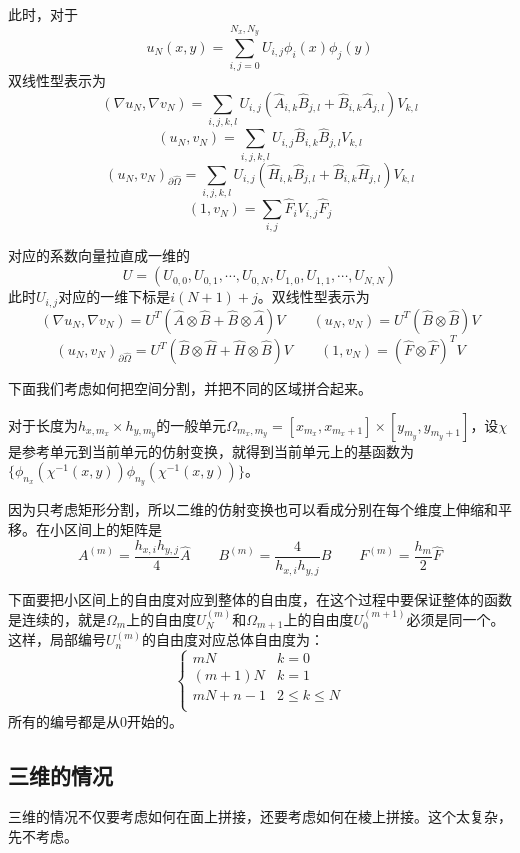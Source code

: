 \documentclass[UTF8,12pt]{article}
\begin{document}
此时，对于
$$ u_N(x,y) = \sum_{i,j = 0}^{N_x, N_y} U_{i,j} \phi_{i}(x) \phi_{j}(y) $$
双线性型表示为
$$ (\nabla u_N, \nabla v_N) = \sum_{i,j,k,l} U_{i,j} (\hat{A}_{i,k} \hat{B}_{j,l} + \hat{B}_{i,k} \hat{A}_{j,l}) V_{k,l} $$
$$ (u_N, v_N) = \sum_{i,j,k,l} U_{i,j} \hat{B}_{i,k} \hat{B}_{j,l} V_{k,l} $$
$$ (u_N, v_N)_{\partial\hat{\Omega}} = \sum_{i,j,k,l} U_{i,j} (\hat{H}_{i,k} \hat{B}_{j,l} + \hat{B}_{i,k} \hat{H}_{j,l}) V_{k,l} $$
$$ (1, v_N) = \sum_{i,j} \hat{F}_i V_{i,j} \hat{F}_j $$

对应的系数向量拉直成一维的
$$U = (U_{0,0}, U_{0,1}, \cdots, U_{0,N}, U_{1,0}, U_{1,1}, \cdots, U_{N,N})$$
此时$U_{i,j}$对应的一维下标是$i(N+1)+j$。双线性型表示为
$$ (\nabla u_N, \nabla v_N) = U^T (\hat{A} \otimes \hat{B} + \hat{B} \otimes \hat{A}) V \qquad (u_N, v_N) = U^T (\hat{B} \otimes \hat{B}) V $$
$$ (u_N, v_N)_{\partial\hat{\Omega}} = U^T (\hat{B} \otimes \hat{H} + \hat{H} \otimes \hat{B}) V \qquad (1, v_N) = (\hat{F} \otimes \hat{F})^T V $$

下面我们考虑如何把空间分割，并把不同的区域拼合起来。

对于长度为$h_{x,m_x} \times h_{y,m_y}$的一般单元$\Omega_{m_x, m_y} = [x_{m_x}, x_{m_x+1}] \times [y_{m_y}, y_{m_y+1}]$，设$\chi$是参考单元到当前单元的仿射变换，就得到当前单元上的基函数为$\{\phi_{n_x}(\chi^{-1}(x,y)) \phi_{n_y}(\chi^{-1}(x,y))\}$。

因为只考虑矩形分割，所以二维的仿射变换也可以看成分别在每个维度上伸缩和平移。在小区间上的矩阵是
$$ A^{(m)} = \frac{h_{x,i} h_{y,j}}{4} \hat{A} \qquad B^{(m)} = \frac{4}{h_{x,i} h_{y,j}} \hat{B} \qquad F^{(m)} = \frac{h_m}{2} \hat{F} $$

下面要把小区间上的自由度对应到整体的自由度，在这个过程中要保证整体的函数是连续的，就是$\Omega_m$上的自由度$U^{(m)}_N$和$\Omega_{m+1}$上的自由度$U^{(m+1)}_0$必须是同一个。这样，局部编号$U^{(m)}_n$的自由度对应总体自由度为：
\begin{equation}
\left\{  \begin{array}{ll}
m N & k = 0 \\
(m+1) N & k = 1 \\
m N + n - 1 & 2 \leq k \leq N \\
\end{array}  \right.
\end{equation}
所有的编号都是从0开始的。

\subsection{三维的情况}

三维的情况不仅要考虑如何在面上拼接，还要考虑如何在棱上拼接。这个太复杂，先不考虑。
\end{document}
